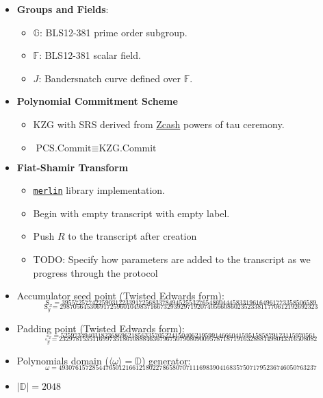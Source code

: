 \documentclass[
]{article}
\providecommand{\tightlist}{%
  \setlength{\itemsep}{0pt}\setlength{\parskip}{0pt}}
\begin{document}
\begin{itemize}
\item
  \textbf{Groups and Fields}:

  \begin{itemize}
  \tightlist
  \item
    \(\mathbb{G}\): BLS12-381 prime order subgroup.
  \item
    \(\mathbb{F}\): BLS12-381 scalar field.
  \item
    \(J\): Bandersnatch curve defined over \(\mathbb{F}\).
  \end{itemize}
\item
  \textbf{Polynomial Commitment Scheme}

  \begin{itemize}
  \tightlist
  \item
    KZG with SRS derived from
    \href{https://zfnd.org/conclusion-of-the-powers-of-tau-ceremony}{Zcash}
    powers of tau ceremony.
  \item
    \(\text{PCS.Commit} \equiv \text{KZG.Commit}\)
  \end{itemize}
\item
  \textbf{Fiat-Shamir Transform}

  \begin{itemize}
  \tightlist
  \item
    \href{https://merlin.cool}{\texttt{merlin}} library implementation.
  \item
    Begin with empty transcript with empty label.
  \item
    Push \(R\) to the transcript after creation
  \item
    TODO: Specify how parameters are added to the transcript as we
    progress through the protocol
  \end{itemize}
\item
  Accumulator seed point (Twisted Edwards form):
  \[_{\text{S}_x = 3955725774225903122339172568337849452553276548604445833196164961773358506589}\]
  \[_{\text{S}_y = 29870564530691725960104983716673293929719207405660860235233811770612192692323}\]
\item
  Padding point (Twisted Edwards form):
  \[_{\square_x = 5259734940318236869621856335705224150406219599146660415951585879123115970561}\]
  \[_{\square_y = 23297815351169973518610888463679675079080900957871871916328881498043316508082}\]
\item
  Polynomials domain (\(\langle \omega \rangle = \mathbb{D}\))
  generator:
  \[_{\omega = 49307615728544765012166121802278658070711169839041683575071795236746050763237}\]
\item
  \(|\mathbb{D}| = 2048\)
\end{itemize}
\end{document}
